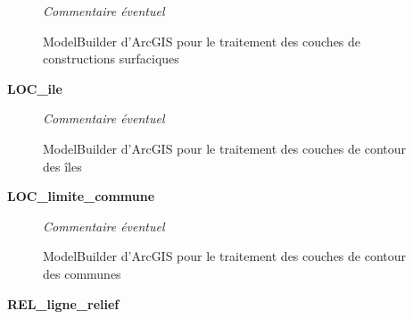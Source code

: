 \documentclass{themeensg}
\begin{document}
\begin{appendices}

\addtocounter{figure}{-1}
\begin{figure}
\addtocounter{figure}{1}
\centering
{}%
\caption{ModelBuilder d'ArcGIS pour le traitement des couches de constructions surfaciques}%
\textit{Commentaire éventuel}
\end{figure}


\clearpage


\begin{center}
    \Large
    \textbf{LOC\_ile}
\end{center}


\addtocounter{figure}{-1}
\begin{figure}
\addtocounter{figure}{1}
\centering
{}%
\caption{ModelBuilder d'ArcGIS pour le traitement des couches de contour des îles}%
\textit{Commentaire éventuel}
\end{figure}


\clearpage


\begin{center}
    \Large
    \textbf{LOC\_limite\_commune}
\end{center}


\addtocounter{figure}{-1}
\begin{figure}
\addtocounter{figure}{1}
\centering
{}%
\caption{ModelBuilder d'ArcGIS pour le traitement des couches de contour des communes}%
\textit{Commentaire éventuel}
\end{figure}


\clearpage

\begin{center}
    \Large
    \textbf{REL\_ligne\_relief}
\end{center}



\end{appendices}
\end{document}
